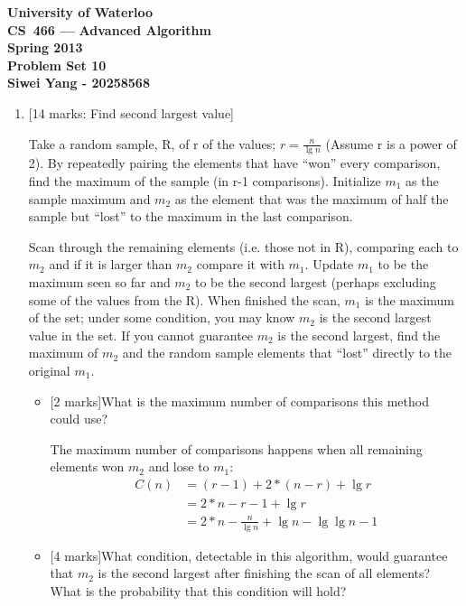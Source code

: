 \documentclass[12pt]{article}
\begin{document}
\begin{center}
\large\bf University of Waterloo\\
CS~466 --- Advanced Algorithm\\
Spring 2013\\
Problem Set 10\\
Siwei Yang - 20258568\\
\end{center}
\bigskip

\begin{enumerate}

\item{} [14 marks: Find second largest value]

Take a random sample, R, of r of the values; $r = \frac{n}{\lg n}$ (Assume r is a power of 2). By repeatedly pairing the elements that have “won” every comparison, find the maximum of the sample (in r-1 comparisons). Initialize $m_{1}$ as the sample maximum and $m_{2}$ as the element that was the maximum of half the sample but “lost” to the maximum in the last comparison.

Scan through the remaining elements (i.e. those not in R), comparing each to $m_{2}$ and if it is larger than $m_{2}$ compare it with $m_{1}$. Update $m_{1}$ to be the maximum seen so far and $m_{2}$ to be the second largest (perhaps excluding some of the values from the R). When finished the scan, $m_{1}$ is the maximum of the set; under some condition, you may know $m_{2}$ is the second largest value in the set. If you cannot guarantee $m_{2}$ is the second largest, find the maximum of $m_{2}$ and the random sample elements that “lost” directly to the original $m_{1}$.

\begin{itemize}
\item{}[2 marks]What is the maximum number of comparisons this method could use?

The maximum number of comparisons happens when all remaining elements won $m_{2}$ and lose to $m_{1}$:
\begin{align*}
C(n) &= (r - 1) + 2 * (n - r) + \lg r
\\ &= 2 * n - r - 1 + \lg r
\\ &= 2 * n - \frac{n}{\lg n} + \lg n - \lg \lg n - 1
\end{align*}

\item{}[4 marks]What condition, detectable in this algorithm, would guarantee that $m_{2}$ is the second largest after finishing the scan of all elements? What is the probability that this condition will hold?


\end{itemize}
\end{enumerate}
\end{document}
